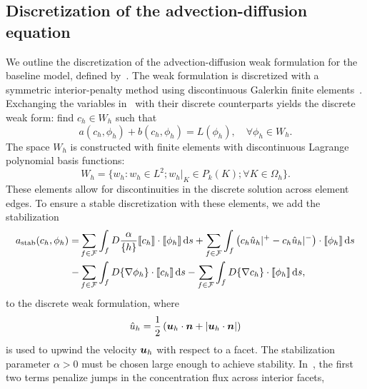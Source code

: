 \documentclass{WileyMSP-template}
\begin{document}
\subsection{Discretization of the advection-diffusion equation}
We outline the discretization of the advection-diffusion weak formulation
for the baseline model, defined
by~.
The weak formulation is discretized with a symmetric interior-penalty method using
discontinuous Galerkin finite elements~\cite{Arnold1982AnElements}.
Exchanging the variables in~ with their discrete
counterparts yields the discrete weak form: find $c_h\in W_h$ such that
\begin{equation*}
    a(c_h, \phi_h) + b(c_h, \phi_h) = L(\phi_h), \quad\forall\phi_h\in W_h.
\end{equation*}
The space $W_h$ is constructed with finite elements with
discontinuous Lagrange polynomial basis functions:
\begin{equation}
    W_h = \Big\{w_h : w_h\in L^2;  w_h\vert_K\in P_k(K); \forall K\in\Omega_h\Big\}.
\end{equation}
These elements allow for discontinuities in the discrete solution across element edges.
To ensure a stable discretization with these elements, we add the stabilization
\begin{equation}
    \begin{aligned}
        a_{\mathrm{stab}}(c_h, \phi_h)
        = &\sum_{f\in \mathcal{F}}\int_f{D\frac{\alpha}{\{h\}}\llbracket c_h\rrbracket\cdot\llbracket\phi_h\rrbracket}\,\mathrm ds
        +\sum_{f\in \mathcal{F}}\int_f{\left({c_h \hat{u}_h}|^+ - {c_h \hat{u}_h}|^-\right)\cdot\llbracket\phi_h\rrbracket}\,\mathrm ds  \\
         -&\sum_{f\in \mathcal{F}}\int_f{D\{\nabla\phi_h\}\cdot\llbracket c_h\rrbracket}\,\mathrm ds
         -\sum_{f\in \mathcal{F}}\int_f{D\{\nabla c_h\}\cdot\llbracket\phi_h\rrbracket}\,\mathrm ds,
    \end{aligned}\label{eq:SIP_stabilization}
\end{equation}
to the discrete weak formulation, where
\begin{equation*}
    \hat{u}_h = \frac{1}{2}\left(\bm{u}_h\cdot\bm{n} + \vert\bm{u}_h\cdot\bm{n}\vert\right)
\end{equation*}
is used to upwind the velocity $\bm{u}_h$ with respect to a
facet. The stabilization parameter $\alpha>0$ must be chosen
large enough to achieve stability. In~, the first two terms
penalize jumps in the concentration flux across interior facets,
\end{document}
